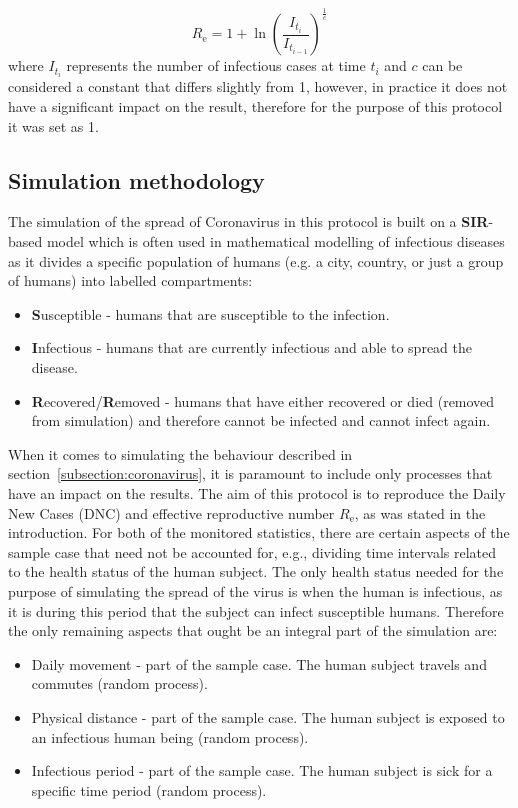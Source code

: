 \documentclass[a4paper]{article}
\begin{document}
\begin{equation}
	R_\textrm{e} = 1 + \ln\left(\frac{I_{t_i}}{I_{t_{i-1}}}\right)^\frac{1}{c}
	\label{equation:effective-reproductive-number}
\end{equation}
\noindent
where $I_{t_i}$ represents the number of infectious cases at time $t_i$ and $c$ can be considered a constant that differs slightly from 1, however, in practice it does not have a significant impact on the result, therefore for the purpose of this protocol it was set as 1.



\subsection{Simulation methodology}\label{subsection:simulation-methodology}
The simulation of the spread of Coronavirus in this protocol is built on a \textbf{SIR}-based model which is often used in mathematical modelling of infectious diseases as it divides a specific population of humans (e.g. a city, country, or just a group of humans) into labelled compartments:
\begin{itemize}
	\item \textbf{S}usceptible - humans that are susceptible to the infection.
	\item \textbf{I}nfectious - humans that are currently infectious and able to spread the disease.
	\item \textbf{R}ecovered/\textbf{R}emoved - humans that have either recovered or died (removed from simulation) and therefore cannot be infected and cannot infect again. 
\end{itemize}

When it comes to simulating the behaviour described in section~\ref{subsection:coronavirus}, it is paramount to include only processes that have an impact on the results. The aim of this protocol is to reproduce the Daily New Cases (DNC) and effective reproductive number $R_\textrm{e}$, as was stated in the introduction. For both of the monitored statistics, there are certain aspects of the sample case that need not be accounted for, e.g., dividing time intervals related to the health status of the human subject. The only health status needed for the purpose of simulating the spread of the virus is when the human is infectious, as it is during this period that the subject can infect susceptible humans. Therefore the only remaining aspects that ought be an integral part of the simulation are:
\begin{itemize}
	\item Daily movement -  part of the sample case. The human subject travels and commutes (random process).
	\item Physical distance -  part of the sample case. The human subject is exposed to an infectious human being (random process).
	\item Infectious period -  part of the sample case. The human subject is sick for a specific time period (random process).
\end{itemize}
\end{document}
